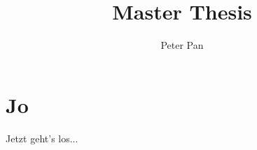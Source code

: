 \documentclass{bht-thesis}
\title{Master Thesis}
\author{Peter Pan}
\begin{document}
	\maketitle
	\section{Jo}
	Jetzt geht's los...
\end{document}
